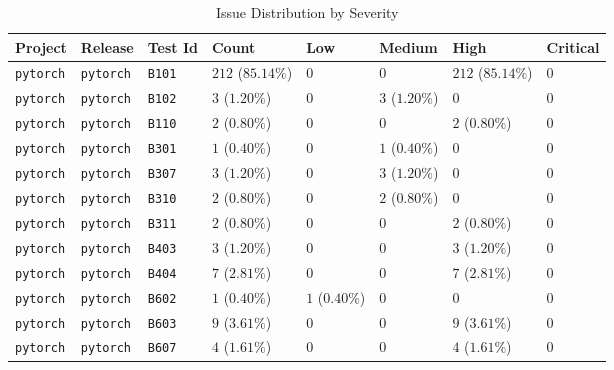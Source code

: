 \begin{table}
\caption{Issue Distribution by Severity}
\label{tab:issue-distribution}
\begin{tabular}{llllllll}
\toprule
Project & Release & Test Id & Count & Low & Medium & High & Critical \\
\midrule
\texttt{pytorch} & \texttt{pytorch} & \texttt{B101} & $212$ ($85.14\%$) & $0$ & $0$ & $212$ ($85.14\%$) & $0$ \\
\texttt{pytorch} & \texttt{pytorch} & \texttt{B102} & $3$ ($1.20\%$) & $0$ & $3$ ($1.20\%$) & $0$ & $0$ \\
\texttt{pytorch} & \texttt{pytorch} & \texttt{B110} & $2$ ($0.80\%$) & $0$ & $0$ & $2$ ($0.80\%$) & $0$ \\
\texttt{pytorch} & \texttt{pytorch} & \texttt{B301} & $1$ ($0.40\%$) & $0$ & $1$ ($0.40\%$) & $0$ & $0$ \\
\texttt{pytorch} & \texttt{pytorch} & \texttt{B307} & $3$ ($1.20\%$) & $0$ & $3$ ($1.20\%$) & $0$ & $0$ \\
\texttt{pytorch} & \texttt{pytorch} & \texttt{B310} & $2$ ($0.80\%$) & $0$ & $2$ ($0.80\%$) & $0$ & $0$ \\
\texttt{pytorch} & \texttt{pytorch} & \texttt{B311} & $2$ ($0.80\%$) & $0$ & $0$ & $2$ ($0.80\%$) & $0$ \\
\texttt{pytorch} & \texttt{pytorch} & \texttt{B403} & $3$ ($1.20\%$) & $0$ & $0$ & $3$ ($1.20\%$) & $0$ \\
\texttt{pytorch} & \texttt{pytorch} & \texttt{B404} & $7$ ($2.81\%$) & $0$ & $0$ & $7$ ($2.81\%$) & $0$ \\
\texttt{pytorch} & \texttt{pytorch} & \texttt{B602} & $1$ ($0.40\%$) & $1$ ($0.40\%$) & $0$ & $0$ & $0$ \\
\texttt{pytorch} & \texttt{pytorch} & \texttt{B603} & $9$ ($3.61\%$) & $0$ & $0$ & $9$ ($3.61\%$) & $0$ \\
\texttt{pytorch} & \texttt{pytorch} & \texttt{B607} & $4$ ($1.61\%$) & $0$ & $0$ & $4$ ($1.61\%$) & $0$ \\
\bottomrule
\end{tabular}
\end{table}
